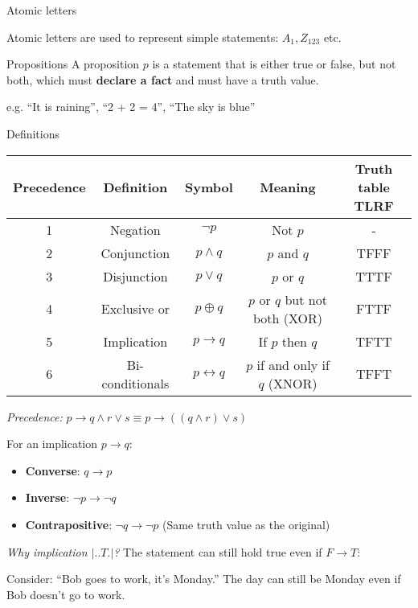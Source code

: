 \documentclass{article}
\begin{document}
\begin{knBox}
    {Atomic letters}

    Atomic letters are used to represent simple statements: $A_1, Z_{123}$ etc.
\end{knBox}

\begin{theorem}{Propositions}
    A proposition $p$ is a statement that is either true or false, but not both, which must \textbf{declare a fact} and must have a truth value.

    \tcblower
    e.g. ``It is raining'', ``2 + 2 = 4'', ``The sky is blue''
\end{theorem}

\begin{definition}{Definitions}
    \begin{tabular}{|c|c|c|c|c|}
        \hline
        Precedence & Definition      & Symbol                & Meaning                       & Truth table TLRF \\
        \hline
        1          & Negation        & $\neg p$              & Not $p$                       & -                \\
        2          & Conjunction     & $p \land q$           & $p$ and $q$                   & TFFF             \\
        3          & Disjunction     & $p \lor q$            & $p$ or $q$                    & TTTF             \\
        4          & Exclusive or    & $p \oplus q$          & $p$ or $q$ but not both (XOR) & FTTF             \\
        5          & Implication     & $p \rightarrow q$     & If $p$ then $q$               & TFTT             \\
        6          & Bi-conditionals & $p \leftrightarrow q$ & $p$ if and only if $q$ (XNOR) & TFFT             \\
        \hline
    \end{tabular}

    \textit{Precedence:} $p \rightarrow q \land r \lor s \equiv p\rightarrow ((q \land r)\lor s)$

    For an implication $p \rightarrow q$:
    \begin{itemize}
        \item \textbf{Converse}: $q \rightarrow p$
        \item \textbf{Inverse}: $\neg p \rightarrow \neg q$
        \item \textbf{Contrapositive}: $\neg q \rightarrow \neg p$ (Same truth value as the original)
    \end{itemize}

    \tcblower
    \textit{Why implication $|..T.|$?} The statement can still hold true even if $F \rightarrow T$:

    Consider: ``Bob goes to work, it's Monday.'' The day can still be Monday even if Bob doesn't go to work.
\end{definition}
\end{document}
